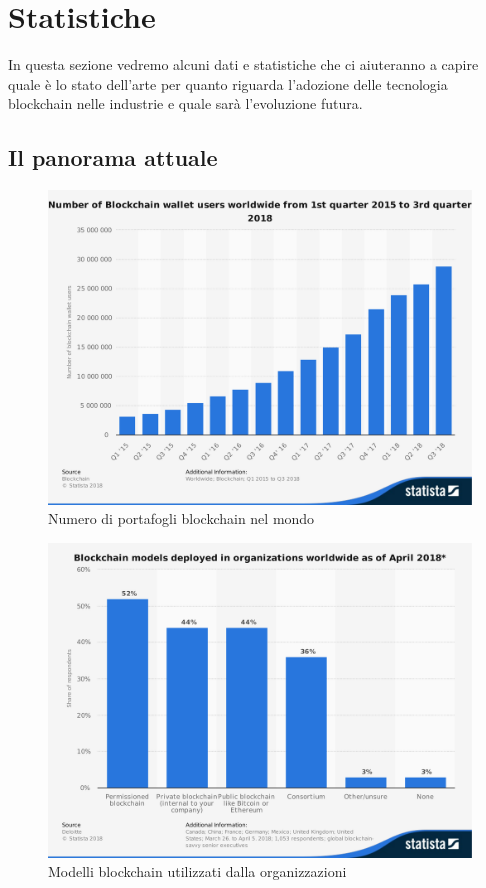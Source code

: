 \section{Statistiche}
In questa sezione vedremo alcuni dati e statistiche che ci aiuteranno a capire quale è
lo stato dell'arte per quanto riguarda l'adozione delle tecnologia blockchain nelle industrie
e quale sarà l'evoluzione futura.

\subsection{Il panorama attuale}
\begin{figure}[H]
	\centering
	\includegraphics[width=.75\linewidth]{images/chap_intro/number-of-blockchain-wallet.pdf}
	\caption{Numero di portafogli blockchain nel mondo \cite{number-of-blockchain-wallet}}
\end{figure}
\begin{figure}[H]
	\centering
	\includegraphics[width=.75\linewidth]{images/chap_intro/model-focus-for-blockchain.pdf}
	\caption{Modelli blockchain utilizzati dalla organizzazioni \cite{model-focus-for-blockchain}}
\end{figure}

